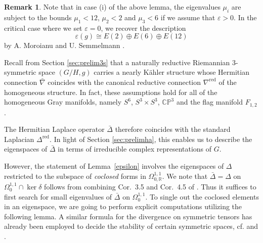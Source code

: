 \documentclass[12pt]{scrartcl}
\theoremstyle{plain}
\theoremstyle{definition}
\newtheorem{bem}[satz]{Remark}
\newcommand{\R}{\mathbb{R}}%
\newcommand{\CP}{\mathbb{CP}}%
\newcommand{\CR}{\nabla^{\mathrm{red}}}%
\newcommand{\Lcr}{\Delta^{\mathrm{red}}}%
\begin{document}
\begin{bem}
 Note that in case (i) of the above lemma, the eigenvalues $\mu_i$ are subject to the bounds $\mu_1<12$, $\mu_2<2$ and $\mu_3<6$ if we assume that $\varepsilon>0$. In the critical case where we set $\varepsilon=0$, we recover the description
 \[\varepsilon(g)\cong E(2)\oplus E(6)\oplus E(12)\]
 by A. Moroianu and U. Semmelmann \cite[Thm.~5.1]{nearlykaehler}.
\end{bem}

Recall from Section \ref{sec:prelim3s} that a naturally reductive Riemannian $3$-symmetric space $(G/H,g)$ carries a nearly Kähler structure whose Hermitian connection $\bar\nabla$ coincides with the canonical reductive connection $\CR$ of the homogeneous structure. In fact, these assumptions hold for all of the homogeneous Gray manifolds, namely $S^6$, $S^3\times S^3$, $\CP^3$ and the flag manifold $F_{1,2}$.

The Hermitian Laplace operator $\bar\Delta$ therefore coincides with the standard Laplacian $\Lcr$. In light of Section \ref{sec:prelimha}, this enables us to describe the eigenspaces of $\bar\Delta$ in terms of irreducible complex representations of $G$.

However, the statement of Lemma~\ref{epsilon} involves the ei\-gen\-spa\-ces of $\Delta$ restricted to the subspace of \emph{coclosed} forms in $\Omega^{1,1}_{0,\R}$. We note that $\bar\Delta=\Delta$ on $\Omega^{1,1}_0\cap\ker\delta$ follows from combining Cor.~3.5 and Cor.~4.5 of \cite{nearlykaehler}. Thus it suffices to first search for small eigenvalues of $\bar\Delta$ on $\Omega^{1,1}_0$. To single out the coclosed elements in an eigenspace, we are going to perform explicit computations utilizing the following lemma. A similar formula for the divergence on symmetric tensors has already been employed to decide the stability of certain symmetric spaces, cf. \cite[Lem.~3.3]{schwahn} and \cite[Sec.~2]{sw}.
\end{document}
